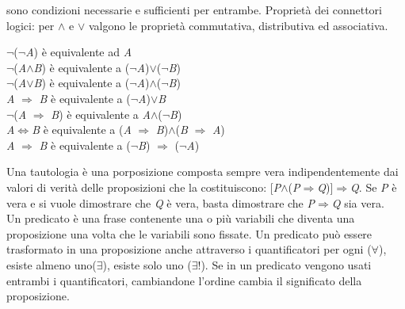 sono condizioni necessarie e sufficienti per entrambe. Propriet\`a dei connettori logici: per $\wedge$ e $\lor$ valgono le propriet\`a commutativa, distributiva ed
associativa. 
\begin{center}
$\neg$($\neg$\textit{A}) \`e equivalente ad \textit{A}\\
$\neg$(\textit{A}$\wedge$\textit{B}) \`e equivalente a ($\neg$\textit{A})$\lor$($\neg$\textit{B})\\
$\neg$(\textit{A}$\lor$\textit{B}) \`e equivalente a ($\neg$\textit{A})$\wedge$($\neg$\textit{B})\\
\textit{A} $\Rightarrow$ \textit{B} \`e equivalente a ($\neg$\textit{A})$\lor$\textit{B}\\ 
$\neg$(\textit{A} $\Rightarrow$ \textit{B}) \`e equivalente a \textit{A}$\wedge$($\neg$\textit{B})\\ 
\textit{A}$\Leftrightarrow$\textit{B} \`e equivalente a (\textit{A} $\Rightarrow$ \textit{B})$\wedge$(\textit{B} $\Rightarrow$ \textit{A})\\
\textit{A} $\Rightarrow$ \textit{B} \`e equivalente a ($\neg$\textit{B}) $\Rightarrow$ ($\neg$\textit{A})
\end{center}
Una tautologia \`e una porposizione composta sempre vera indipendentemente dai valori di verit\`a delle proposizioni che la costituiscono: [\textit{P}$\wedge$(\textit{P}$\Rightarrow$\textit{Q})]$\Rightarrow$\textit{Q}. Se \textit{P} \`e vera e si vuole dimostrare che \textit{Q} \`e vera, basta dimostrare che \textit{P}$\Rightarrow$\textit{Q} sia vera.\\
Un predicato \`e una frase contenente una o pi\`u variabili che diventa una proposizione una volta che le variabili sono fissate. 
Un predicato pu\`o essere trasformato in una proposizione anche attraverso i quantificatori per ogni ($\forall$), esiste almeno uno($\exists$), esiste solo uno ($\exists !$). Se in un predicato vengono usati entrambi i quantificatori, cambiandone l'ordine cambia il significato della proposizione.